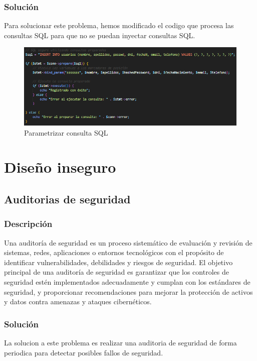 \documentclass{report}
\begin{document}
                \subsubsection{Solución}
                    Para solucionar este problema, hemos modificado el codigo que procesa las consultas SQL para que no se puedan inyectar consultas SQL.
                    \begin{figure}[H]
                        \centering
                        \includegraphics[width=\textwidth]{./img/vulnerabilidades/3.3.1.1.png}
                        \caption{Parametrizar consulta SQL}
                    \end{figure}
            \clearpage
        \section{Diseño inseguro}
            \subsection{Auditorias de seguridad}
                \subsubsection{Descripción}
                    Una auditoría de seguridad es un proceso sistemático de evaluación y revisión de sistemas, redes, aplicaciones o entornos tecnológicos con el propósito de identificar vulnerabilidades, debilidades y riesgos de seguridad. El objetivo principal de una auditoría de seguridad es garantizar que los controles de seguridad estén implementados adecuadamente y cumplan con los estándares de seguridad, y proporcionar recomendaciones para mejorar la protección de activos y datos contra amenazas y ataques cibernéticos.
                \subsubsection{Solución}
                    La solucion a este problema es realizar una auditoria de seguridad de forma periodica para detectar posibles fallos de seguridad. 
            \clearpage
\end{document}
